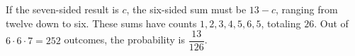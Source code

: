 If the seven-sided result is $c$, the six-sided sum must be $13-c$, ranging from twelve down to six. These sums have counts $1,2,3,4,5,6,5$, totaling $26$. Out of $6\cdot6\cdot7=252$ outcomes, the probability is $\boxed{\dfrac{13}{126}}$.
